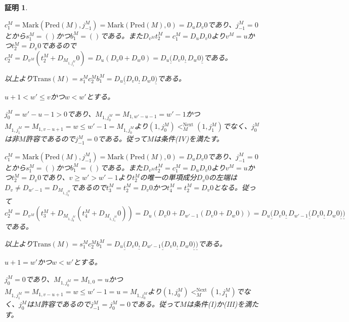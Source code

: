 \documentclass[dvipdfmx,uplatex]{jsarticle}
\theoremstyle{customnonumberbreakfortheorem}
\theoremstyle{customnonumberbreakforproof}
\newtheorem{hideableproof}{証明}
\begin{document}
\begin{hideableproof}
\begin{indented}
\begin{indented}
			\item \(c_1^M = \textrm{Mark}(\textrm{Pred}(M),j_{-1}^M) = \textrm{Mark}(\textrm{Pred}(M),0) = D_u D_v 0\)であり、\(j_{-1}^M = 0\)とから\(s_1^M = ()\)かつ\(b_1^M = ()\)である。また\(D_{v^M} t_2^M = c_1^M = D_u D_v 0\)より\(v^M = u\)かつ\(t_2^M = D_v 0\)であるので\(c_2^M = D_{v^M}(t_2^M + D_{M_{1,j_1^M}} 0) = D_u(D_v 0 + D_w 0) = D_u \underline{(} D_v 0 \underline{,} D_w 0 \underline{)}\)である。
			\item 以上より\(\textrm{Trans}(M) = s_1^M c_2^M b_1^M = D_u \underline{(} D_v 0 \underline{,} D_w 0 \underline{)}\)である。
		\end{indented}
		\item \(u+1 < w' \leq v\)かつ\(w < w'\)とする。
		\begin{indented}
			\item \(j_0^M = w'-u-1 > 0\)であり、\(M_{1,j_0^M} = M_{1,w'-u-1} = w'-1\)かつ\(M_{1,j_1^M} = M_{1,v-u+1} = w \leq w'-1 = M_{1,j_0^M}\)より\((1,j_0^M) <_M^{\textrm{Next}} (1,j_1^M)\)でなく、\(j_0^M\)は非\(M\)許容であるので\(j_{-1}^M = 0\)である。従って\(M\)は条件(IV)を満たす。
			\item \(c_1^M = \textrm{Mark}(\textrm{Pred}(M),j_{-1}^M) = \textrm{Mark}(\textrm{Pred}(M),0) = D_u D_v 0\)であり、\(j_{-1}^M = 0\)とから\(s_1^M = ()\)かつ\(b_1^M = ()\)である。また\(D_{v^M} t_2^M = c_1^M = D_u D_v 0\)より\(v^M = u\)かつ\(t_2^M = D_v 0\)であり、\(v \geq w' > w'-1\)より\(t_2^M\)の唯一の単項成分\(D_v 0\)の左端は\(D_v \neq D_{w'-1} = D_{M_{1,j_0^M}}\)であるので\(t_3^M = t_2^M = D_v  0\)かつ\(t_4^M = t_2^M = D_v 0\)となる。従って\(c_2^M = D_{v^M}(t_3^M + D_{M_{1,j_0^M}}(t_4^M + D_{M_{1,j_1^M}} 0)) = D_u(D_v 0 + D_{w'-1}(D_v 0 + D_w 0)) = D_u \underline{(} D_v 0 \underline{,} D_{w'-1} \underline{(} D_v 0 \underline{,} D_w 0 \underline{)} \underline{)}\)である。
			\item 以上より\(\textrm{Trans}(M) = s_1^M c_2^M b_1^M = D_u \underline{(} D_v 0 \underline{,} D_{w'-1} \underline{(} D_v 0 \underline{,} D_w 0 \underline{)} \underline{)}\)である。
		\end{indented}
		\item \(u+1 = w'\)かつ\(w < w'\)とする。
		\begin{indented}
			\item \(j_0^M = 0\)であり、\(M_{1,j_0^M} = M_{1,0} = u\)かつ\(M_{1,j_1^M} = M_{1,v-u+1} = w \leq w'-1 = u = M_{1,j_0^M}\)より\((1,j_0^M) <_M^{\textrm{Next}} (1,j_1^M)\)でなく、\(j_0^M\)は\(M\)許容であるので\(j_{-1}^M = j_0^M = 0\)である。従って\(M\)は条件(I)か(III)を満たす。

\end{indented}
\end{indented}
\end{hideableproof}
\end{document}
